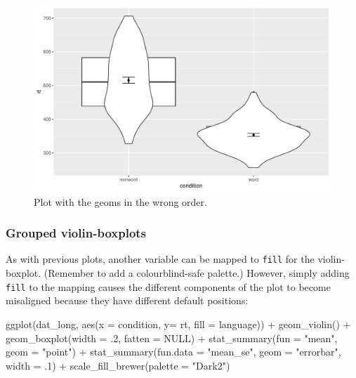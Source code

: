 \documentclass[
  english,
  doc,floatsintext]{apa6}
\newenvironment{Shaded}{\begin{snugshade}}{\end{snugshade}}
\newcommand{\AttributeTok}[1]{\textcolor[rgb]{0.77,0.63,0.00}{#1}}
\newcommand{\ConstantTok}[1]{\textcolor[rgb]{0.00,0.00,0.00}{#1}}
\newcommand{\DecValTok}[1]{\textcolor[rgb]{0.00,0.00,0.81}{#1}}
\newcommand{\FunctionTok}[1]{\textcolor[rgb]{0.00,0.00,0.00}{#1}}
\newcommand{\NormalTok}[1]{#1}
\newcommand{\SpecialCharTok}[1]{\textcolor[rgb]{0.00,0.00,0.00}{#1}}
\newcommand{\StringTok}[1]{\textcolor[rgb]{0.31,0.60,0.02}{#1}}
\begin{document}
\begin{figure}

{\centering \includegraphics[width=1\linewidth]{images/viobox1b-1} 

}

\caption{Plot with the geoms in the wrong order.}\label{fig:viobox1b}
\end{figure}

\hypertarget{grouped-violin-boxplots}{%
\subsubsection{Grouped violin-boxplots}\label{grouped-violin-boxplots}}

As with previous plots, another variable can be mapped to \texttt{fill} for the violin-boxplot. (Remember to add a colourblind-safe palette.) However, simply adding \texttt{fill} to the mapping causes the different components of the plot to become misaligned because they have different default positions:

\begin{Shaded}
\begin{Highlighting}[]
\FunctionTok{ggplot}\NormalTok{(dat\_long, }\FunctionTok{aes}\NormalTok{(}\AttributeTok{x =}\NormalTok{ condition, }\AttributeTok{y=}\NormalTok{ rt, }\AttributeTok{fill =}\NormalTok{ language)) }\SpecialCharTok{+}
  \FunctionTok{geom\_violin}\NormalTok{() }\SpecialCharTok{+}
  \FunctionTok{geom\_boxplot}\NormalTok{(}\AttributeTok{width =}\NormalTok{ .}\DecValTok{2}\NormalTok{, }
               \AttributeTok{fatten =} \ConstantTok{NULL}\NormalTok{) }\SpecialCharTok{+}
  \FunctionTok{stat\_summary}\NormalTok{(}\AttributeTok{fun =} \StringTok{"mean"}\NormalTok{,  }\AttributeTok{geom =} \StringTok{"point"}\NormalTok{) }\SpecialCharTok{+}
  \FunctionTok{stat\_summary}\NormalTok{(}\AttributeTok{fun.data =} \StringTok{"mean\_se"}\NormalTok{, }
               \AttributeTok{geom =} \StringTok{"errorbar"}\NormalTok{, }
               \AttributeTok{width =}\NormalTok{ .}\DecValTok{1}\NormalTok{) }\SpecialCharTok{+}
  \FunctionTok{scale\_fill\_brewer}\NormalTok{(}\AttributeTok{palette =} \StringTok{"Dark2"}\NormalTok{)}
\end{Highlighting}
\end{Shaded}
\end{document}
